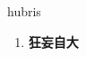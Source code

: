 
\begin{frame}
{\huge hubris}
\begin{center}
\begin{enumerate}\Large
  \item \textbf{狂妄自大}
\end{enumerate}
\end{center}
\end{frame}
